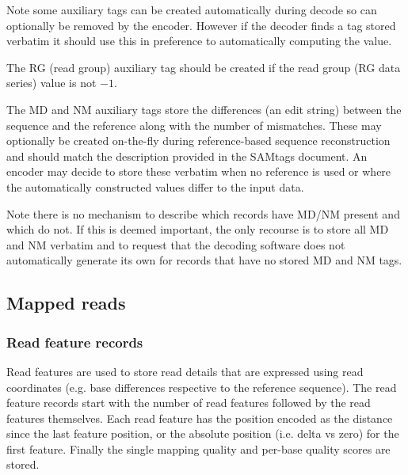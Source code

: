\documentclass[a4paper]{article}
\begin{document}
Note some auxiliary tags can be created automatically during decode so can optionally be removed by the encoder.
However if the decoder finds a tag stored verbatim it should use this in preference to automatically computing the value.

The RG (read group) auxiliary tag should be created if the read group (RG data series) value is not $-1$.

The MD and NM auxiliary tags store the differences (an edit string) between the sequence and the reference along with the number of mismatches.
These may optionally be created on-the-fly during reference-based sequence reconstruction and should match the description provided in the SAMtags document.
An encoder may decide to store these verbatim when no reference is used or where the automatically constructed values differ to the input data.

Note there is no mechanism to describe which records have MD/NM present and which do not.
If this is deemed important, the only recourse is to store all MD and NM verbatim and to request that the decoding software does not automatically generate its own for records that have no stored MD and NM tags.

\subsection{\textbf{Mapped reads}}
\label{subsec:mapped}

\subsubsection*{\textbf{Read feature records}}
\label{subsec:features}

Read features are used to store read details that are expressed using read coordinates 
(e.g. base differences respective to the reference sequence). The read feature 
records start with the number of read features followed by the read features themselves.
Each read feature has the position encoded as the distance since the
last feature position, or the absolute position (i.e. delta vs zero)
for the first feature.
Finally the single mapping quality and per-base quality scores are stored.
\end{document}
